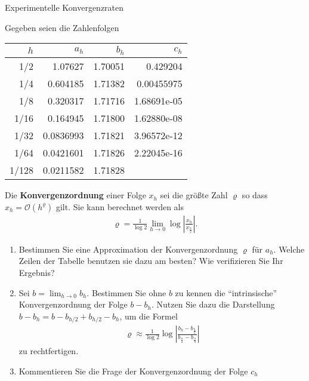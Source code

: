 \begin{uebung}{Experimentelle Konvergenzraten}

Gegeben seien die Zahlenfolgen
\begin{center}
	\begin{tabular}{|r|r|r|r|}
        \hline $h$ & $a_h$ & $b_h$ & $c_h$ \\\hline
        1/2   & 1.07627    &  1.70051 & 0.429204    \\
        1/4   & 0.604185   &  1.71382 & 0.00455975  \\
        1/8   & 0.320317   &  1.71716 & 1.68691e-05 \\
        1/16  & 0.164945   &  1.71800 & 1.62880e-08 \\
        1/32  & 0.0836993  &  1.71821 & 3.96572e-12 \\
        1/64  & 0.0421601  &  1.71826 & 2.22045e-16 \\
        1/128 & 0.0211582  &  1.71828 & \\
        \hline
    \end{tabular}      
\end{center}

Die \textbf{Konvergenzordnung} einer Folge $x_h$ sei die größte
Zahl $\varrho$ so dass
$x_h = \mathcal O(h^\varrho)$ gilt. Sie kann berechnet werden als
    \begin{gather*}
      \varrho = \frac1{\log 2} \lim_{h\to 0} \log\left|\frac{x_h}{x_{\frac h2}}\right|.
    \end{gather*}        

\begin{enumerate}
	\item Bestimmen Sie eine Approximation der Konvergenzordnung $\varrho$ für $a_h$.
      Welche Zeilen der Tabelle benutzen sie dazu am besten? Wie
      verifizieren Sie Ihr Ergebnis?
    \item Sei $b=\lim_{h\to0} b_h$. Bestimmen Sie ohne $b$ zu kennen
      die ``intrinsische'' Konvergenzordnung der Folge $b-b_h$. Nutzen
      Sie dazu die Darstellung $b-b_h = b-b_{h/2} + b_{h/2} - b_h$, um die Formel
      \begin{gather*}
        \varrho \approx \frac1{\log 2}
        \log \left|\frac{b_h - b_{\frac h2}}{b_{\frac h2} -b_{\frac h4}}\right|
      \end{gather*}
      zu rechtfertigen.
    \item Kommentieren Sie die Frage der Konvergenzordnung der Folge $c_h$
\end{enumerate}
\end{uebung}


